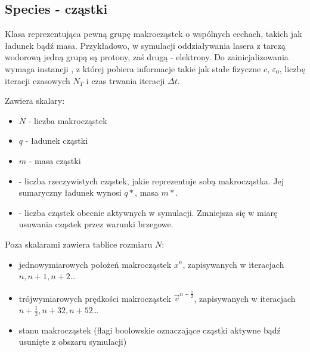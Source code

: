 \subsection{Species - cząstki}
Klasa reprezentująca pewną grupę makrocząstek o wspólnych cechach, takich
jak ładunek bądź masa.  Przykładowo, w symulacji oddziaływania lasera z
tarczą wodorową jedną grupą są protony, zaś drugą - elektrony.  Do
zainicjalizowania wymaga instancji , z której pobiera informacje
takie jak stałe fizyczne $c$, $\varepsilon_0$, liczbę iteracji czasowych
$N_T$ i czas trwania iteracji $\Delta t$.

Zawiera skalary:
\begin{itemize}
    \item $N$ - liczba makrocząstek
    \item $q$ - ładunek cząstki
    \item $m$ - masa cząstki
    \item {} - liczba rzeczywistych cząstek, jakie reprezentuje
        sobą makrocząstka. Jej sumaryczny ładunek wynosi $q *
        $, masa $m * $.
    \item {} - liczba cząstek obecnie aktywnych w symulacji.
        Zmniejsza się w miarę usuwania cząstek przez warunki brzegowe.
\end{itemize}

Poza skalarami zawiera tablice rozmiaru $N$:
\begin{itemize}
    \item jednowymiarowych położeń makrocząstek $x^n$, zapisywanych w
        iteracjach $n, n+1, n+2$\ldots
    \item trójwymiarowych prędkości makrocząstek $\vec{v}^{n+\frac{1}{2}}$,
        zapisywanych w iteracjach $n+\frac{1}{2}, n+{3}{2}, n+{5}{2}$\ldots
    \item stanu makrocząstek (flagi boolowskie oznaczające cząstki aktywne
        bądź usunięte z obszaru symulacji)
\end{itemize}

